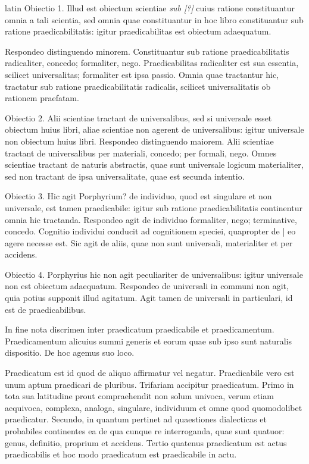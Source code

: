 \begin{otherlanguage*}{latin}
\pstart
Obiectio 1. Illud est obiectum scientiae \emph{sub [?]} cuius ratione constituantur omnia a tali scientia, sed omnia quae constituantur in hoc libro constituantur sub ratione praedicabilitatis:
igitur praedicabilitas est obiectum adaequatum. 
\pend

\pstart
Respondeo distinguendo minorem. Constituantur sub ratione praedicabilitatis radicaliter, concedo; formaliter, nego. Praedicabilitas radicaliter est sua essentia, scilicet universalitas; formaliter est ipsa passio. Omnia quae tractantur hic, tractatur sub ratione praedicabilitatis radicalis, scilicet universalitatis ob rationem praefatam. 
\pend

\pstart
Obiectio 2. Alii scientiae tractant de universalibus, sed si universale esset obiectum huius libri, aliae scientiae non agerent de universalibus:
igitur universale non obiectum huius libri. Respondeo distinguendo maiorem. Alii scientiae tractant de universalibus per materiali, concedo; per formali, nego. Omnes scientiae tractant de naturis abstractis, quae sunt universale logicum materialiter, sed non tractant de ipsa universalitate, quae est secunda intentio. 
\pend

\pstart
Obiectio 3. Hic agit Porphyrium? de individuo, quod est singulare et non universale, est tamen praedicabile:
igitur sub ratione praedicabilitatis continentur omnia hic tractanda. Respondeo agit de individuo formaliter, nego; terminative, concedo. Cognitio individui conducit ad cognitionem speciei, quapropter de \textnormal{|} eo agere necesse est. Sic agit de aliis, quae non sunt universali, materialiter et per accidens. 
\pend

\pstart
Obiectio 4. Porphyrius hic non agit peculiariter de universalibus:
igitur universale non est obiectum adaequatum. Respondeo de universali in communi non agit, quia potius supponit illud agitatum. Agit tamen de universali in particulari, id est de praedicabilibus. 
\pend

\pstart
In fine nota discrimen inter praedicatum praedicabile et praedicamentum. Praedicamentum alicuius summi generis et eorum quae sub ipso sunt naturalis dispositio. De hoc agemus suo loco. 
\pend

\pstart
Praedicatum est id quod de aliquo affirmatur vel negatur. Praedicabile vero est unum aptum praedicari de pluribus. Trifariam accipitur praedicatum. Primo in tota sua latitudine prout compraehendit non solum univoca, verum etiam aequivoca, complexa, analoga, singulare, individuum et omne quod quomodolibet praedicatur. Secundo, in quantum pertinet ad quaestiones dialecticas et probabiles continentes ea de qua cunque re interroganda, quae sunt quatuor:
genus, definitio, proprium et accidens. Tertio quatenus praedicatum est actus praedicabilis et hoc modo praedicatum est praedicabile in actu. 
\pend


\end{otherlanguage*}
